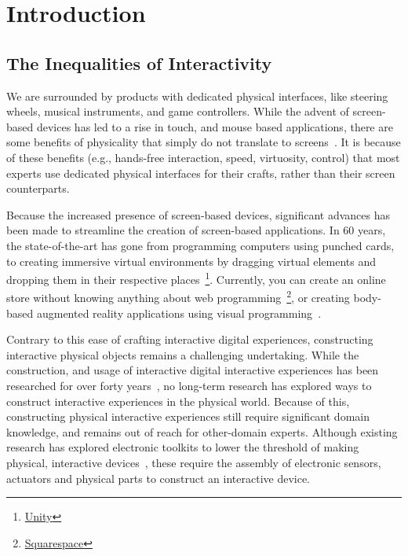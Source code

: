 \chapter{Introduction}
  \section{The Inequalities of Interactivity}
    We are surrounded by products with dedicated physical interfaces, like
    steering wheels, musical instruments, and game controllers. While the advent
    of screen-based devices has led to a rise in touch, and mouse based
    applications, there are some benefits of physicality that simply do not
    translate to screens~\cite{klemmer:2006}. It is because of these benefits
    (e.g., hands-free interaction, speed, virtuosity, control) that most experts
    use dedicated physical interfaces for their crafts, rather than their screen
    counterparts.

    Because the increased presence of screen-based devices, significant advances
    has been made to streamline the creation of screen-based applications.  In
    60 years, the state-of-the-art has gone from programming computers using
    punched cards, to creating immersive virtual environments by dragging
    virtual elements and dropping them in their respective
    places~\footnote{\href{https://unity.com}{Unity}}.  Currently, you can
    create an online store without knowing anything about web
    programming~\footnote{\href{https://www.squarespace.com}{Squarespace}}, or
    creating body-based augmented reality applications using visual
    programming~\cite{Pohl:2020}.

    Contrary to this ease of crafting interactive digital experiences,
    constructing interactive physical objects remains a challenging undertaking.
    While the construction, and usage of interactive digital interactive
    experiences has been researched for over forty years~\cite{CHI:, UIST:}, no
    long-term research has explored ways to construct interactive experiences in
    the physical world. Because of this, constructing physical interactive
    experiences still require significant domain knowledge, and remains out of
    reach for other-domain experts. Although existing research has explored
    electronic toolkits to lower the threshold of making physical, interactive
    devices~\cite{Greenberg:2001, Arduino:}, these require the assembly of
    electronic sensors, actuators and physical parts to construct an interactive
    device.

